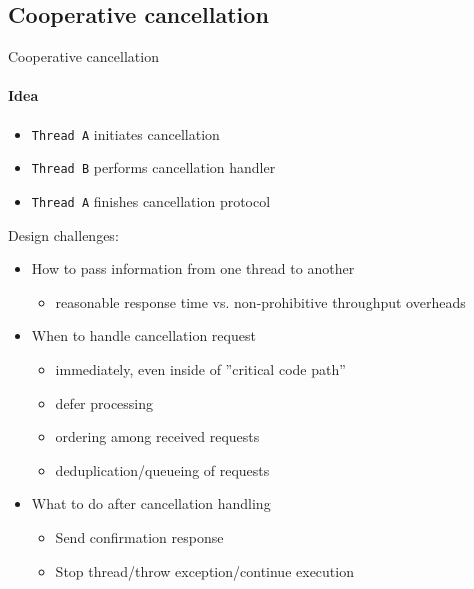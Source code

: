 
\subsection{Cooperative cancellation}
\showTOCSub 

\begin{frame}{Cooperative cancellation}
\framesubtitle{Idea}

\begin{itemize}
    \item \texttt{Thread A} initiates cancellation
    \item \texttt{Thread B} performs cancellation handler
    \item \texttt{Thread A} finishes cancellation protocol
\end{itemize}

\pause
Design challenges:
\begin{itemize}
    \item How to pass information from one thread to another
    \begin{itemize}
        \item reasonable response time  vs. non-prohibitive throughput overheads
    \end{itemize}

    \item When to handle cancellation request
    \begin{itemize}
        \item immediately, even inside of ''critical code path''
        \item defer processing
        \item ordering among received requests
        \item deduplication/queueing of requests
    \end{itemize}

    \item What to do after cancellation handling
    \begin{itemize}
        \item Send confirmation response
        \item Stop thread/throw exception/continue execution
    \end{itemize}
\end{itemize}
\end{frame}


